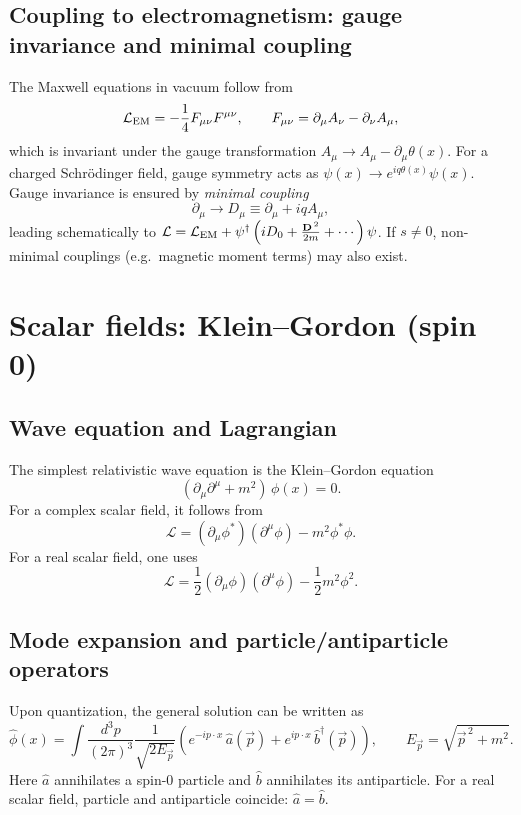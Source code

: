 \subsection{Coupling to electromagnetism: gauge invariance and minimal coupling}
The Maxwell equations in vacuum follow from
\begin{equation}
\mathcal L_{\rm EM}=-\frac14 F_{\mu\nu}F^{\mu\nu},\qquad
F_{\mu\nu}=\partial_\mu A_\nu-\partial_\nu A_\mu,
\end{equation}
which is invariant under the gauge transformation $A_\mu\to A_\mu-\partial_\mu\theta(x)$.
For a charged Schr\"odinger field, gauge symmetry acts as $\psi(x)\to e^{iq\theta(x)}\psi(x)$.
Gauge invariance is ensured by \emph{minimal coupling}
\begin{equation}
\partial_\mu\to D_\mu\equiv \partial_\mu+i q A_\mu,
\end{equation}
leading schematically to $\mathcal L=\mathcal L_{\rm EM}+\psi^\dagger\left(iD_0+\frac{\vec D^{\,2}}{2m}+\cdots\right)\psi$.
If $s\neq 0$, non-minimal couplings (e.g.\ magnetic moment terms) may also exist.

\section{Scalar fields: Klein--Gordon (spin 0)}
\subsection{Wave equation and Lagrangian}
The simplest relativistic wave equation is the Klein--Gordon equation
\begin{equation}
(\partial_\mu\partial^\mu + m^2)\,\phi(x)=0.
\end{equation}
For a complex scalar field, it follows from
\begin{equation}
\mathcal L=(\partial_\mu\phi^\ast)(\partial^\mu\phi)-m^2\phi^\ast\phi.
\end{equation}
For a real scalar field, one uses
\begin{equation}
\mathcal L=\frac12(\partial_\mu\phi)(\partial^\mu\phi)-\frac12 m^2\phi^2.
\end{equation}

\subsection{Mode expansion and particle/antiparticle operators}
Upon quantization, the general solution can be written as
\begin{equation}
\hat\phi(x)=\int\frac{d^3p}{(2\pi)^3}\frac{1}{\sqrt{2E_{\vec p}}}
\left(e^{-ip\cdot x}\,\hat a(\vec p)+e^{ip\cdot x}\,\hat b^\dagger(\vec p)\right),
\qquad
E_{\vec p}=\sqrt{\vec p^{\,2}+m^2}.
\end{equation}
Here $\hat a$ annihilates a spin-0 particle and $\hat b$ annihilates its antiparticle. For a real scalar field,
particle and antiparticle coincide: $\hat a=\hat b$.

